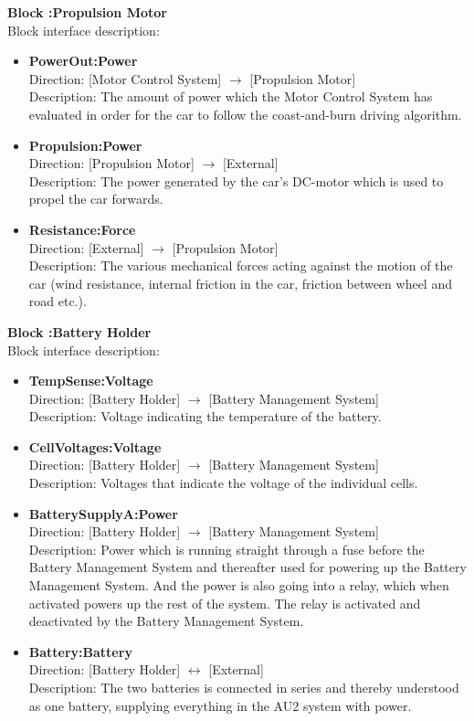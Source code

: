 \textbf{Block :Propulsion Motor}\\
Block interface description:
\begin{itemize}
	\item \textbf{PowerOut:Power}\\
	Direction: [Motor Control System] $\rightarrow$ [Propulsion Motor]\\
	Description: The amount of power which the Motor Control System has evaluated in order for the car to follow the coast-and-burn driving algorithm.
	\item \textbf{Propulsion:Power}\\
	Direction: [Propulsion Motor] $\rightarrow$ [External]\\
	Description: The power generated by the car's DC-motor which is used to propel the car forwards.  
	\item \textbf{Resistance:Force}\\
	Direction: [External] $\rightarrow$ [Propulsion Motor]\\
	Description: The various mechanical forces acting against the motion of the car (wind resistance, internal friction in the car, friction between wheel and road etc.).
\end{itemize}

\textbf{Block :Battery Holder}\\
Block interface description:
\begin{itemize}
	\item \textbf{TempSense:Voltage}\\
	Direction: [Battery Holder] $\rightarrow$ [Battery Management System]\\
	Description: Voltage indicating the temperature of the battery.
	\item \textbf{CellVoltages:Voltage}\\
	Direction: [Battery Holder] $\rightarrow$ [Battery Management System]\\
	Description: Voltages that indicate the voltage of the individual cells.
	\item \textbf{BatterySupplyA:Power}\\
	Direction: [Battery Holder] $\rightarrow$ [Battery Management System]\\
	Description: Power which is running straight through a fuse before the Battery Management System and thereafter used for powering up the Battery Management System. And the power is also going into a relay, which when activated powers up the rest of the system. The relay is activated and deactivated by the Battery Management System.
	\item \textbf{Battery:Battery}\\
	Direction: [Battery Holder] $\leftrightarrow$ [External]\\
	Description: The two batteries is connected in series and thereby understood as one battery, supplying everything in the AU2 system with power.
\end{itemize}